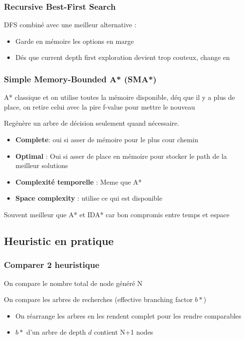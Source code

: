 		\subsubsection{Recursive Best-First Search}		
			DFS combiné avec une meilleur alternative :
			\begin{itemize}
				\item Garde en mémoire les options en marge
				\item Dés que current depth first exploration devient trop couteux, change en
			\end{itemize}
			
		\subsubsection{Simple Memory-Bounded A* (SMA*)}
		
			A* classique et on utilise toutes la mémoire disponible, déq que il y a plus de place, on retire celui avec la pire f-value pour mettre le nouveau
			
			Regénère un arbre de décision seulement quand nécessaire.
			
			\begin{itemize}
				\item \textbf{Complete}: oui si asser de mémoire pour le plus cour chemin
				\item \textbf{Optimal} : Oui si asser de place en mémoire pour stocker le path de la meilleur solutions
				\item \textbf{Complexité temporelle} : Meme que A*
				\item \textbf{Space complexity} : utilise ce qui est disponible

			\end{itemize}
			
			Souvent meilleur que A* et IDA* car bon compromis entre temps et espace
		
	
	\subsection{Heuristic en pratique}
		\subsubsection{Comparer 2 heuristique}	
			On compare le nombre total de node généré N
			
			On compare les arbres de recherches (effective branching factor $b*$)
			\begin{itemize}
				\item On réarrange les arbres en les rendent complet pour les rendre comparables
				\item $b*$ d'un arbre de depth $d$ contient N+1 nodes
			\end{itemize}
			
